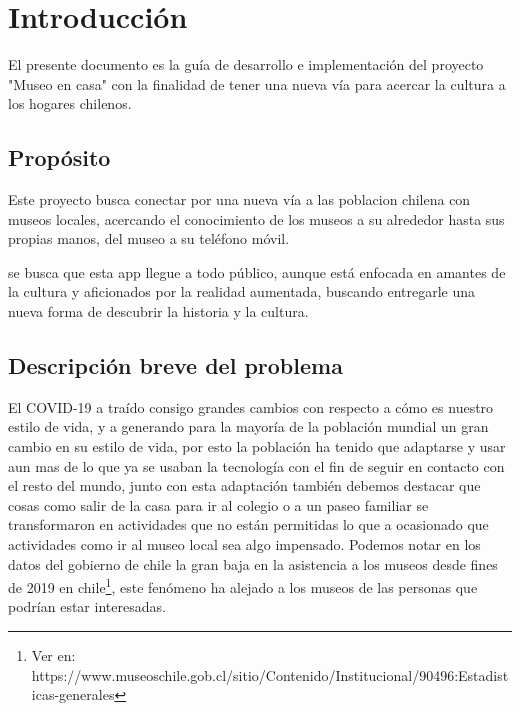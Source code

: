 \section{Introducción}
El presente documento es la guía de desarrollo e implementación del proyecto "Museo en casa" con la finalidad de tener una nueva vía para acercar la cultura a los hogares chilenos.

\subsection{Propósito}
Este proyecto busca conectar por una nueva vía a las poblacion chilena con museos locales, acercando el conocimiento de los museos a su alrededor hasta sus propias manos, del museo a su teléfono móvil.

se busca que esta app llegue a todo público, aunque está enfocada en amantes de la cultura y aficionados por la realidad aumentada, buscando entregarle una nueva forma de descubrir la historia y la cultura.

\subsection{Descripción breve del problema}
El COVID-19 a traído consigo grandes cambios con respecto a cómo es nuestro estilo de vida, y a generando para la mayoría de la población mundial un gran cambio en su estilo de vida, por esto la población ha tenido que adaptarse y usar aun mas de lo que ya se usaban la tecnología con el fin de seguir en contacto con el resto del mundo,  junto con esta adaptación también debemos destacar que cosas como salir de la casa para ir al colegio o a un paseo familiar se transformaron en actividades que no están permitidas lo que a ocasionado que actividades como ir al museo local sea algo impensado. Podemos notar en los datos del gobierno de chile la gran baja en la asistencia a los museos desde fines de 2019 en chile\footnote{Ver en: https://www.museoschile.gob.cl/sitio/Contenido/Institucional/90496:Estadisticas-generales}, este fenómeno ha alejado a los museos de las personas que podrían estar interesadas.
